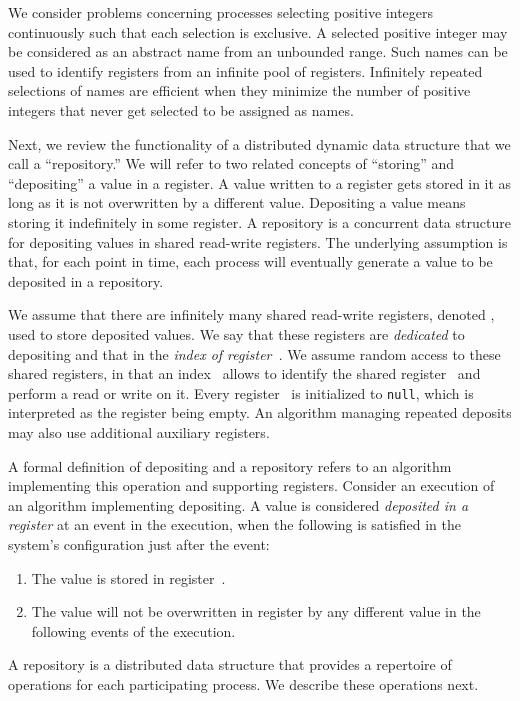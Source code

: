 \documentclass[11pt]{article}
\begin{document}
We consider problems concerning processes selecting positive integers continuously such that each selection is exclusive.
A selected positive integer may be considered as an abstract name from an unbounded range.
Such names can be used to identify registers from an infinite pool of registers.
Infinitely repeated selections of names are efficient when they minimize the number of positive  integers that  never get selected to be assigned as names.

Next, we review the functionality of a distributed dynamic data structure that we call a ``repository.''
We will refer to two related concepts of ``storing'' and ``depositing'' a value in a register.
A value written to a register gets stored in it as long as it is not overwritten by a different value.
Depositing a value means  storing it indefinitely in some register.
A repository is a concurrent data structure for depositing values in shared read-write registers.
The underlying assumption is that, for each point in time, each process will eventually generate a value to be deposited in a repository.

We assume that there are infinitely many shared read-write registers, denoted , used to store deposited values.
We say that these registers are \emph{dedicated} to depositing and that  in the \emph{index of register~}.
We assume random access to these shared registers, in that an index~ allows to identify the shared register~ and perform a read or write on it.
Every register~ is initialized to \texttt{null}, which is interpreted as the register being empty. 
An algorithm managing repeated deposits may also use additional auxiliary registers.


A formal definition of depositing and a repository refers to an algorithm implementing this operation and supporting registers.
Consider an execution of an algorithm implementing depositing.
A value  is considered \emph{deposited in a register } at an event in the execution, when the following is satisfied in the system's configuration just after the event:
\begin{enumerate}
\item
The value  is stored in register~. 

\item
The value  will not be overwritten in register   by any different value in the following events of the execution.
\end{enumerate}
A repository is a distributed data structure that provides a repertoire of operations for each participating process.
We describe these operations next.
\end{document}

